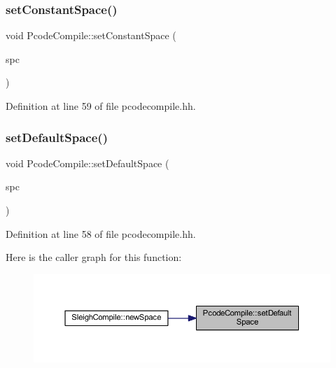 \subsubsection{\texorpdfstring{setConstantSpace()}{setConstantSpace()}}
{\footnotesize\ttfamily void Pcode\+Compile\+::set\+Constant\+Space (\begin{DoxyParamCaption}\item[{\mbox{\hyperlink{class_addr_space}{Addr\+Space}} $\ast$}]{spc }\end{DoxyParamCaption})\hspace{0.3cm}{\ttfamily [inline]}}



Definition at line 59 of file pcodecompile.\+hh.

\mbox{\label{class_pcode_compile_af7985f4e76ed0efc5c9aa9dbe6d0a218}} 
\subsubsection{\texorpdfstring{setDefaultSpace()}{setDefaultSpace()}}
{\footnotesize\ttfamily void Pcode\+Compile\+::set\+Default\+Space (\begin{DoxyParamCaption}\item[{\mbox{\hyperlink{class_addr_space}{Addr\+Space}} $\ast$}]{spc }\end{DoxyParamCaption})\hspace{0.3cm}{\ttfamily [inline]}}



Definition at line 58 of file pcodecompile.\+hh.

Here is the caller graph for this function\+:
\nopagebreak
\begin{figure}[H]
\begin{center}
\leavevmode
\includegraphics[width=350pt]{class_pcode_compile_af7985f4e76ed0efc5c9aa9dbe6d0a218_icgraph}
\end{center}
\end{figure}
\mbox{\label{class_pcode_compile_adfc1e533f15be38cb5169f00bc4d0f2f}} 
